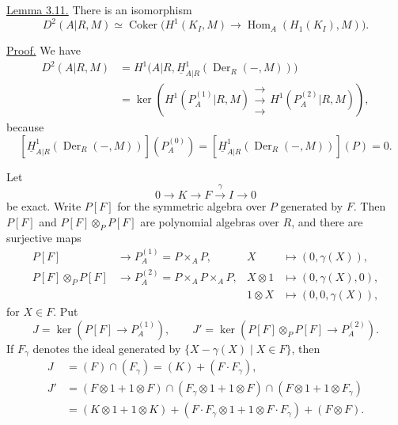 \underline{Lemma 3.11.} There is an isomorphism
\[
 D^2(A|R,M)\simeq
 \operatorname{Coker}\bigl(
 H^1(K_I,M)\longrightarrow
 \operatorname{Hom}_A(H_1(K_I),M)\bigr).
\]

\underline{Proof.} We have
\begin{align*}
D^2(A|R,M)
 &=H^1\bigl(A|R,
   \underline H^1_{A|R}(\operatorname{Der}_R(-,M))\bigr)\\
 &=\ker\left(
   H^1(P_A^{(1)}|R,M)
   \mathrel{\substack{\longrightarrow\\[-.6ex]\longrightarrow\\[-.6ex]\longrightarrow}}
   H^1(P_A^{(2)}|R,M)\right),
\end{align*}
because
\[
 [\underline H^1_{A|R}(\operatorname{Der}_R(-,M))](P_A^{(0)})
 =[\underline H^1_{A|R}(\operatorname{Der}_R(-,M))](P)=0.
\]

Let
\[
 0\longrightarrow K\longrightarrow F\xrightarrow{\gamma}I
 \longrightarrow0
\]
be exact. Write $P[F]$ for the symmetric algebra over $P$
generated by $F$. Then $P[F]$ and
$P[F]\otimes_PP[F]$ are polynomial algebras over $R$, and there
are surjective maps
\begin{align*}
P[F]&\longrightarrow P_A^{(1)}=P\times_AP,
&X&\longmapsto(0,\gamma(X)),\\
P[F]\otimes_PP[F]&\longrightarrow
P_A^{(2)}=P\times_AP\times_AP,
&X\otimes1&\longmapsto(0,\gamma(X),0),\\[-.3ex]
&&1\otimes X&\longmapsto(0,0,\gamma(X)),
\end{align*}
for $X\in F$. Put
\[
 J=\ker(P[F]\longrightarrow P_A^{(1)}),
 \qquad
 J'=\ker(P[F]\otimes_PP[F]\longrightarrow P_A^{(2)}).
\]
If $F_\gamma$ denotes the ideal generated by
$\{X-\gamma(X)\mid X\in F\}$, then
\begin{align*}
J&=(F)\cap(F_\gamma)=(K)+(F\cdot F_\gamma),\\
J'&=(F\otimes1+1\otimes F)
 \cap(F_\gamma\otimes1+1\otimes F)
 \cap(F\otimes1+1\otimes F_\gamma)\\
&=(K\otimes1+1\otimes K)
 +(F\cdot F_\gamma\otimes1+1\otimes F\cdot F_\gamma)
 +(F\otimes F).
\end{align*}


